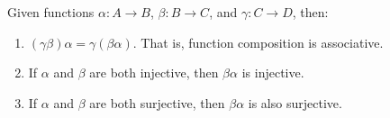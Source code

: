     \begin{thm}
        Given functions \(\alpha : A \to B\), \(\beta : B \to C\), and \(\gamma : C \to D\), then:
        \begin{enumerate}
            \item \((\gamma\beta)\alpha = \gamma(\beta\alpha)\). That is, function composition is associative.

            \item If \(\alpha\) and \(\beta\) are both injective, then \(\beta\alpha\) is injective.

            \item If \(\alpha\) and \(\beta\) are both surjective, then \(\beta\alpha\) is also surjective.
        \end{enumerate}
    \end{thm}

